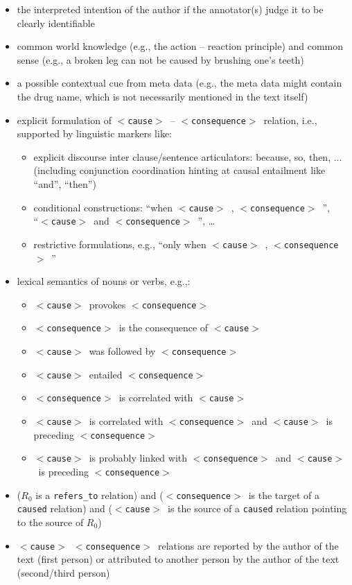 \documentclass[12pt]{article}
\theoremstyle{definition}
\newcommand{\cause}{$<$\texttt{cause}$>$\ }
\newcommand{\conseq}{$<$\texttt{consequence}$>$\ }
\begin{document}
\begin{itemize}
    \item the interpreted intention of the author if the annotator(s) judge it to be clearly identifiable
    \item common world knowledge (e.g., the action -- reaction principle) and common sense (e.g., a broken leg can not be caused by brushing one's teeth)
    \item a possible contextual cue from meta data (e.g., the meta data might contain the drug name, which is not necessarily mentioned in the text itself)
    \item explicit formulation of \cause-- \conseq relation, i.e., supported by linguistic markers like:
    \begin{itemize}
        \item explicit discourse inter clause/sentence articulators: because, so, then, ... (including conjunction coordination hinting at  causal entailment like ``and'', ``then'') %
        \item conditional constructions: ``when \cause , \conseq'',  \\ ``\cause and \conseq'', \ldots
        \item restrictive formulations, e.g., ``only when \cause , \conseq''
    \end{itemize}
    \item lexical semantics of nouns or verbs, e.g.,:
    \begin{itemize}
        \item \cause  provokes \conseq
        \item \conseq is the consequence of \cause
        \item \cause was followed by \conseq
        \item \cause entailed \conseq
        \item \conseq is correlated with \cause
        \item \cause is correlated with \conseq and \cause is preceding \conseq
        \item \cause is probably linked with \conseq and \cause is preceding \conseq
    \end{itemize}
    \item ($R_0$ is a \texttt{refers\_to} relation) and (\conseq is the target of a \texttt{caused} relation) and (\cause is the source of a \texttt{caused} relation pointing  to the source of $R_0$)
    \item \cause \conseq relations are reported by the author of the text (first person) or attributed to another person by the author of the text (second/third person)

\end{itemize}
\end{document}
